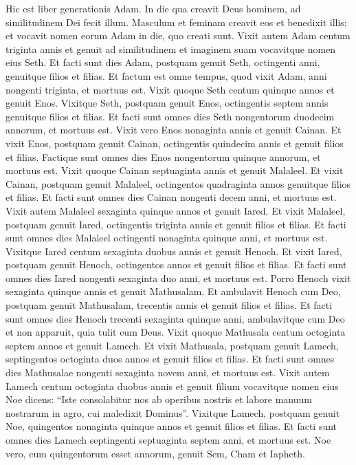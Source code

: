 \begin{biblechapter}
\begin{biblechapter}
\begin{biblechapter}
\begin{biblechapter}
\begin{biblechapter}
\verse Hic est liber generationis Adam. In die qua creavit Deus hominem, ad similitudinem Dei fecit illum. 
\verse Masculum et feminam creavit eos et benedixit illis; et vocavit nomen eorum Adam in die, quo creati sunt. 
\verse Vixit autem Adam centum triginta annis et genuit ad similitudinem et imaginem suam vocavitque nomen eius Seth. 
\verse Et facti sunt dies Adam, postquam genuit Seth, octingenti anni, genuitque filios et filias. 
\verse Et factum est omne tempus, quod vixit Adam, anni nongenti triginta, et mortuus est.
 \verse Vixit quoque Seth centum quinque annos et genuit Enos. 
\verse Vixitque Seth, postquam genuit Enos, octingentis septem annis genuitque filios et filias. 
\verse Et facti sunt omnes dies Seth nongentorum duodecim annorum, et mortuus est.
 \verse Vixit vero Enos nonaginta annis et genuit Cainan. 
\verse Et vixit Enos, postquam genuit Cainan, octingentis quindecim annis et genuit filios et filias. 
 \verse Factique sunt omnes dies Enos nongentorum quinque annorum, et mortuus est.
 \verse Vixit quoque Cainan septuaginta annis et genuit Malaleel. 
\verse Et vixit Cainan, postquam genuit Malaleel, octingentos quadraginta annos genuitque filios et filias. 
\verse Et facti sunt omnes dies Cainan nongenti decem anni, et mortuus est.
 \verse Vixit autem Malaleel sexaginta quinque annos et genuit Iared. 
\verse Et vixit Malaleel, postquam genuit Iared, octingentis triginta annis et genuit filios et filias. 
\verse Et facti sunt omnes dies Malaleel octingenti nonaginta quinque anni, et mortuus est.
 \verse Vixitque Iared centum sexaginta duobus annis et genuit Henoch. 
\verse Et vixit Iared, postquam genuit Henoch, octingentos annos et genuit filios et filias. 
\verse Et facti sunt omnes dies Iared nongenti sexaginta duo anni, et mortuus est.
 \verse Porro Henoch vixit sexaginta quinque annis et genuit Mathusalam. 
\verse Et ambulavit Henoch cum Deo, postquam genuit Mathusalam, trecentis annis et genuit filios et filias. 
\verse Et facti sunt omnes dies Henoch trecenti sexaginta quinque anni, 
\verse ambulavitque cum Deo et non apparuit, quia tulit eum Deus.
 \verse Vixit quoque Mathusala centum octoginta septem annos et genuit Lamech. 
\verse Et vixit Mathusala, postquam genuit Lamech, septingentos octoginta duos annos et genuit filios et filias. 
\verse Et facti sunt omnes dies Mathusalae nongenti sexaginta novem anni, et mortuus est.
 \verse Vixit autem Lamech centum octoginta duobus annis et genuit filium 
\verse vocavitque nomen eius Noe dicens: “Iste consolabitur nos ab operibus nostris et labore manuum nostrarum in agro, cui maledixit Dominus”. 
\verse Vixitque Lamech, postquam genuit Noe, quingentos nonaginta quinque annos et genuit filios et filias. 
\verse Et facti sunt omnes dies Lamech septingenti septuaginta septem anni, et mortuus est.
 \verse Noe vero, cum quingentorum esset annorum, genuit Sem, Cham et Iapheth.
 

\end{biblechapter}
\end{biblechapter}
\end{biblechapter}
\end{biblechapter}
\end{biblechapter}
